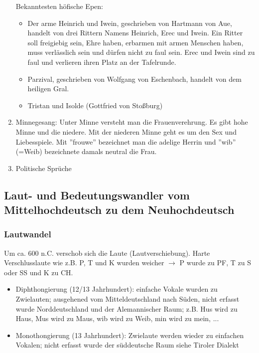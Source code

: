 \documentclass[12pt,a4paper]{article}
\begin{document}
\begin{enumerate}
		Bekanntesten höfische Epen:
		
			\begin{itemize}
			\item Der arme Heinrich und Iwein, geschrieben von Hartmann von Aue, handelt von drei Rittern Namens 						Heinrich, Erec und Iwein. Ein Ritter soll freigiebig sein, Ehre haben, erbarmen mit armen Menschen haben, muss verlässlich sein und dürfen nicht zu faul sein. Erec und Iwein sind zu faul und verlieren ihren Platz an der Tafelrunde.
			
			\item Parzival, geschrieben von Wolfgang von Eschenbach, handelt von dem heiligen Gral.				
			
			\item Tristan und Isolde (Gottfried von Stoßburg)
			\end{itemize}				
	
		\item Minnegesang: Unter Minne versteht man die Frauenverehrung. Es gibt hohe Minne und die niedere. Mit  der niederen Minne geht es um den Sex und Liebesspiele. Mit ''frouwe'' bezeichnet man die adelige Herrin und ''wib'' (=Weib) bezeichnete 	damals neutral die Frau.
		
		\item Politische Sprüche
	
\end{enumerate}	
	
\subsection{Laut- und Bedeutungswandler vom Mittelhochdeutsch zu dem Neuhochdeutsch}

\subsubsection{Lautwandel}
Um ca. 600 n.C. verschob sich die Laute (Lautverschiebung). Harte Verschlusslaute wie z.B. P, T und K wurden weicher $\rightarrow$ P wurde zu PF, T zu S oder SS und K zu CH.

\begin{itemize}
\item Diphthongierung (12/13 Jahrhundert): einfache Vokale wurden zu Zwielauten; ausgehened vom Mitteldeutschland nach
Süden, nicht erfasst wurde Norddeutschland und der Alemannischer Raum; z.B. Hus wird zu Haus, Mus wird zu Maus, wib wird
zu Weib, min wird zu mein, ...

\item Monothongierung (13 Jahrhundert): Zwielaute werden wieder zu einfachen Vokalen; nicht erfasst wurde der süddeutsche Raum siehe Tiroler Dialekt
\end{itemize}
\end{document}
